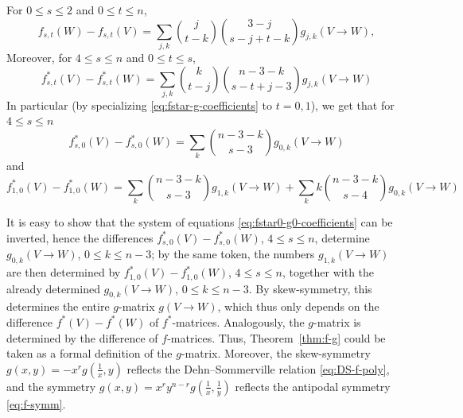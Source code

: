 \documentclass[a4paper,USenglish,cleveref, autoref, thm-restate,nolineno]{socg-lipics-v2021}
\renewcommand{\leq}{\leqslant}
\begin{document}
\begin{corollary} 
\label{cor:f-g-fstar-gstar-coefficients}
For $0\leq s\leq 2$ and $0\leq t\leq n$,
\begin{equation}
\label{eq:f-g-coefficients}
f_{s,t}(W)-f_{s,t}(V) = \sum_{j,k} \binom{j}{t-k}\binom{3-j}{s-j+t-k} g_{j,k}(V\to W),
\end{equation}
Moreover, for $4\leq s \leq n$ and $0\leq t \leq s$,
\begin{equation}
\label{eq:fstar-g-coefficients}
f^*_{s,t}(V)-f^*_{s,t}(W) = \sum_{j,k} \binom{k}{t-j}\binom{n-3-k}{s-t+j-3}g_{j,k}(V\to W)
\end{equation}
In particular (by specializing \eqref{eq:fstar-g-coefficients} to $t=0,1$), we get that for $4\leq s \leq n$
\begin{equation}
\label{eq:fstar0-g0-coefficients}
f^*_{s,0}(V)-f^*_{s,0}(W) = \sum_{k} \binom{n-3-k}{s-3}g_{0,k}(V\to W)
\end{equation}
and
\begin{equation}
\label{eq:fstar-g1-coefficients}
\textstyle f^*_{1,0}(V)-f^*_{1,0}(W) = \sum_{k} \binom{n-3-k}{s-3}g_{1,k}(V\to W) + \sum_{k}k\binom{n-3-k}{s-4}g_{0,k}(V\to W)
\end{equation}
\end{corollary}
\begin{remark} 
\label{rem:g-f+DS-g}
It is easy to show that the system of equations \eqref{eq:fstar0-g0-coefficients} can be inverted, hence the differences $f^*_{s,0}(V)-f^*_{s,0}(W)$, $4\leq s\leq n$, determine $g_{0,k}(V\to W)$, $0\leq k\leq n-3$; by the same token, the numbers $g_{1,k}(V\to W)$ are then determined by $f^*_{1,0}(V)-f^*_{1,0}(W)$, $4\leq s\leq n$, together with the already determined $g_{0,k}(V\to W)$, $0\leq k\leq n-3$. By skew-symmetry, this determines the entire $g$-matrix $g(V\to W)$, which thus only depends on the difference $f^*(V)-f^*(W)$ of $f^*$-matrices. Analogously, the $g$-matrix is determined by the difference of $f$-matrices. Thus, Theorem~\ref{thm:f-g} could be taken as a formal definition of the $g$-matrix.
Moreover, the skew-symmetry $g(x,y)=-x^r g(\frac{1}{x},y)$ reflects the Dehn--Sommerville relation \eqref{eq:DS-f-poly}, and the symmetry $g(x,y)=x^ry^{n-r}g(\frac{1}{x},\frac{1}{y})$ reflects the antipodal symmetry \eqref{eq:f-symm}.
\end{remark}
\end{document}

